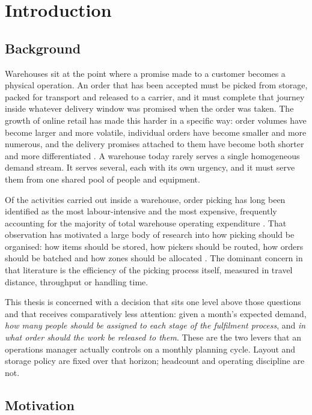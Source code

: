 \chapter{Introduction}
\label{ch:introduction}

\section{Background}
\label{sec:background}

Warehouses sit at the point where a promise made to a customer becomes a physical operation.
An order that has been accepted must be picked from storage, packed for transport and released
to a carrier, and it must complete that journey inside whatever delivery window was promised
when the order was taken. The growth of online retail has made this harder in a specific way:
order volumes have become larger and more volatile, individual orders have become smaller and
more numerous, and the delivery promises attached to them have become both shorter and more
differentiated \citep{boysen2019}. A warehouse today rarely serves a single homogeneous demand
stream. It serves several, each with its own urgency, and it must serve them from one shared
pool of people and equipment.

Of the activities carried out inside a warehouse, order picking has long been identified as
the most labour-intensive and the most expensive, frequently accounting for the majority of
total warehouse operating expenditure \citep{dekoster2007}. That observation has motivated a
large body of research into how picking should be organised: how items should be stored, how
pickers should be routed, how orders should be batched and how zones should be allocated
\citep{gu2007,vangils2018}. The dominant concern in that literature is the efficiency of the
picking process itself, measured in travel distance, throughput or handling time.

This thesis is concerned with a decision that sits one level above those questions and that
receives comparatively less attention: given a month's expected demand, \emph{how many people
should be assigned to each stage of the fulfilment process}, and \emph{in what order should the
work be released to them}. These are the two levers that an operations manager actually
controls on a monthly planning cycle. Layout and storage policy are fixed over that horizon;
headcount and operating discipline are not.

\section{Motivation}
\label{sec:motivation}

